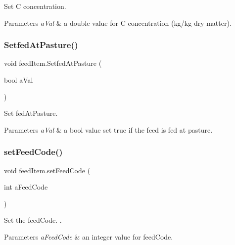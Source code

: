 Set C concentration. 


\begin{DoxyParams}{Parameters}
{\em a\+Val} & a double value for C concentration (kg/kg dry matter). \\
\hline
\end{DoxyParams}
\mbox{\label{classfeed_item_a2274207440dcfc25d1a839153bd3f7ff}} 
\subsubsection{\texorpdfstring{SetfedAtPasture()}{SetfedAtPasture()}}
{\footnotesize\ttfamily void feed\+Item.\+Setfed\+At\+Pasture (\begin{DoxyParamCaption}\item[{bool}]{a\+Val }\end{DoxyParamCaption})\hspace{0.3cm}{\ttfamily [inline]}}



Set fed\+At\+Pasture. 


\begin{DoxyParams}{Parameters}
{\em a\+Val} & a bool value set true if the feed is fed at pasture. \\
\hline
\end{DoxyParams}
\mbox{\label{classfeed_item_a005d6dd8e2c2cb5a7ddf4f904690daf6}} 
\subsubsection{\texorpdfstring{setFeedCode()}{setFeedCode()}}
{\footnotesize\ttfamily void feed\+Item.\+set\+Feed\+Code (\begin{DoxyParamCaption}\item[{int}]{a\+Feed\+Code }\end{DoxyParamCaption})\hspace{0.3cm}{\ttfamily [inline]}}



Set the feed\+Code. . 


\begin{DoxyParams}{Parameters}
{\em a\+Feed\+Code} & an integer value for feed\+Code. \\
\hline
\end{DoxyParams}
\mbox{\label{classfeed_item_ab4acc78c49603c114df456a30b74ecba}} 
